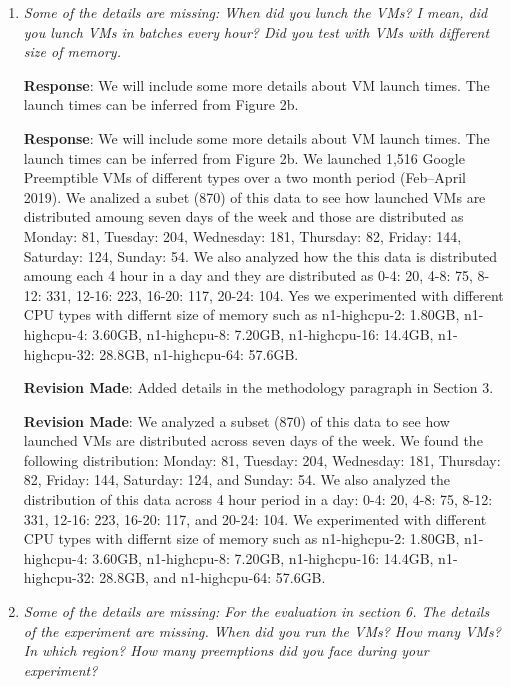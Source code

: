 \documentclass{article}
\newcommand{\resp}[1]{\textbf{Response}: #1}
\newcommand{\revmade}[1]{\textbf{Revision Made}: #1}
\begin{document}
\begin{enumerate}

\item \emph{Some of the details are missing: When did you lunch the VMs? I mean, did you lunch VMs in batches every hour? Did you test with VMs with different size of memory.}

  
\resp{We will include some more details about VM launch times. The launch times can be inferred from Figure 2b.}


\resp{We will include some more details about VM launch times. The launch times can be inferred from Figure 2b.
We launched 1,516 Google Preemptible VMs of different types over a two month period (Feb–April 2019). 
We analized a subet (870) of this data to see how launched VMs are distributed amoung seven days of the week and those are distributed as Monday: 81, Tuesday: 204, Wednesday: 181, Thursday: 82, Friday: 144, Saturday: 124, Sunday: 54.
We also analyzed how the this data is distributed amoung each 4 hour in a day and they are distributed as 0-4: 20, 4-8: 75, 8-12: 331, 12-16: 223, 16-20: 117, 20-24: 104.
Yes we experimented with different CPU types with differnt size of memory such as n1-highcpu-2: 1.80GB, n1-highcpu-4: 3.60GB, n1-highcpu-8: 7.20GB, n1-highcpu-16: 14.4GB, n1-highcpu-32: 28.8GB, n1-highcpu-64: 57.6GB.
}

\revmade{Added details in the methodology paragraph in Section 3.}

\revmade{We analyzed a subset (870) of this data to see how launched VMs are distributed across seven days of the week. We found the following distribution: Monday: 81, Tuesday: 204, Wednesday: 181, Thursday: 82, Friday: 144, Saturday: 124, and Sunday: 54.
We also analyzed the distribution of this data across 4 hour period in a day: 0-4: 20, 4-8: 75, 8-12: 331, 12-16: 223, 16-20: 117, and 20-24: 104.
We experimented with different CPU types with differnt size of memory such as n1-highcpu-2: 1.80GB, n1-highcpu-4: 3.60GB, n1-highcpu-8: 7.20GB, n1-highcpu-16: 14.4GB, n1-highcpu-32: 28.8GB, and n1-highcpu-64: 57.6GB.}


\item \emph{Some of the details are missing: For the evaluation in section 6. The details of the experiment are missing. When did you run the VMs? How many VMs? In which region? How many preemptions did you face during your experiment?}


\end{enumerate}
\end{document}
